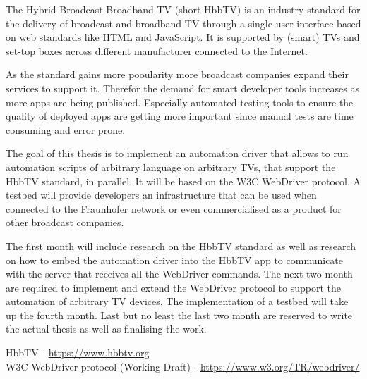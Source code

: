 
The Hybrid Broadcast Broadband TV (short HbbTV) is an industry standard for the delivery of broadcast and broadband TV
through a single user interface based on web standards like HTML and JavaScript. It is supported by (smart) TVs and
set-top boxes across different manufacturer connected to the Internet.


As the standard gains more pooularity more broadcast companies expand their services to support it. Therefor the
demand for smart developer tools increases as more apps are being published. Especially automated testing tools to ensure
the quality of deployed apps are getting more important since manual tests are time consuming and error prone.


The goal of this thesis is to implement an automation driver that allows to run automation scripts of arbitrary language
on arbitrary TVs, that support the HbbTV standard, in parallel. It will be based on the W3C WebDriver protocol. A testbed
will provide developers an infrastructure that can be used when connected to the Fraunhofer network or even commercialised
as a product for other broadcast companies.


The first month will include research on the HbbTV standard as well as research on how to embed the automation driver
into the HbbTV app to communicate with the server that receives all the WebDriver commands. The next two month are
required to implement and extend the WebDriver protocol to support the automation of arbitrary TV devices. The
implementation of a testbed will take up the fourth month. Last but no least the last two month are reserved to write
the actual thesis as well as finalising the work.


HbbTV - \url{https://www.hbbtv.org} \\
W3C WebDriver protocol (Working Draft) - \url{https://www.w3.org/TR/webdriver/}
